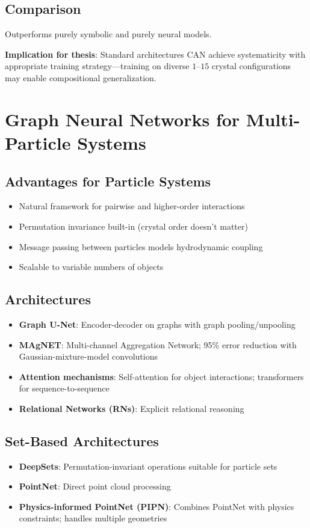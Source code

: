 \subsection{Comparison}
Outperforms purely symbolic and purely neural models.

\textbf{Implication for thesis}: Standard architectures CAN achieve systematicity with appropriate training strategy---training on diverse $1$--$15$ crystal configurations may enable compositional generalization.

\section{Graph Neural Networks for Multi-Particle Systems}

\subsection{Advantages for Particle Systems}
\begin{itemize}
    \item Natural framework for pairwise and higher-order interactions
    \item Permutation invariance built-in (crystal order doesn't matter)
    \item Message passing between particles models hydrodynamic coupling
    \item Scalable to variable numbers of objects
\end{itemize}

\subsection{Architectures}
\begin{itemize}
    \item \textbf{Graph U-Net}: Encoder-decoder on graphs with graph pooling/unpooling
    \item \textbf{MAgNET}: Multi-channel Aggregation Network; 95\% error reduction with Gaussian-mixture-model convolutions \cite{deshpande2024}
    \item \textbf{Attention mechanisms}: Self-attention for object interactions; transformers for sequence-to-sequence
    \item \textbf{Relational Networks (RNs)}: Explicit relational reasoning
\end{itemize}

\subsection{Set-Based Architectures}
\begin{itemize}
    \item \textbf{DeepSets}: Permutation-invariant operations suitable for particle sets
    \item \textbf{PointNet}: Direct point cloud processing
    \item \textbf{Physics-informed PointNet (PIPN)}: Combines PointNet with physics constraints; handles multiple geometries \cite{kashefi2021}
\end{itemize}

